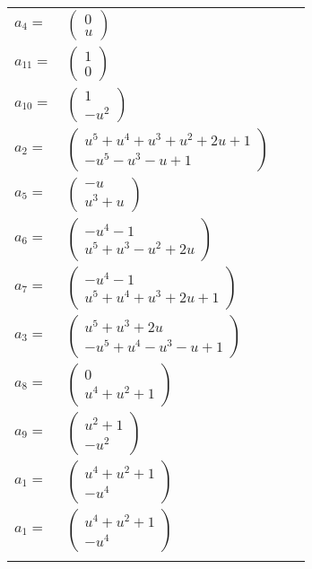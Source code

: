 \documentclass[1p]{elsarticle_modified}
\theoremstyle{definition}
\begin{document}
\begin{tabular}{m{7pt} m{180pt} m{7pt} m{180pt} }
\flushright $a_{4}=$&$\begin{pmatrix}0\\u\end{pmatrix}$ \\
\flushright $a_{11}=$&$\begin{pmatrix}1\\0\end{pmatrix}$ \\
\flushright $a_{10}=$&$\begin{pmatrix}1\\- u^2\end{pmatrix}$ \\
\flushright $a_{2}=$&$\begin{pmatrix}u^5+u^4+u^3+u^2+2 u+1\\- u^5- u^3- u+1\end{pmatrix}$ \\
\flushright $a_{5}=$&$\begin{pmatrix}- u\\u^3+u\end{pmatrix}$ \\
\flushright $a_{6}=$&$\begin{pmatrix}- u^4-1\\u^5+u^3- u^2+2 u\end{pmatrix}$ \\
\flushright $a_{7}=$&$\begin{pmatrix}- u^4-1\\u^5+u^4+u^3+2 u+1\end{pmatrix}$ \\
\flushright $a_{3}=$&$\begin{pmatrix}u^5+u^3+2 u\\- u^5+u^4- u^3- u+1\end{pmatrix}$ \\
\flushright $a_{8}=$&$\begin{pmatrix}0\\u^4+u^2+1\end{pmatrix}$ \\
\flushright $a_{9}=$&$\begin{pmatrix}u^2+1\\- u^2\end{pmatrix}$ \\
\flushright $a_{1}=$&$\begin{pmatrix}u^4+u^2+1\\- u^4\end{pmatrix}$\\ \flushright $a_{1}=$&$\begin{pmatrix}u^4+u^2+1\\- u^4\end{pmatrix}$\\&\end{tabular}
\end{document}
